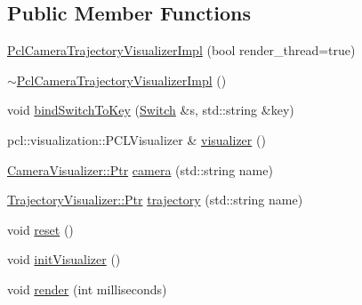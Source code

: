 \subsection*{Public Member Functions}
\begin{DoxyCompactItemize}
\item 
\mbox{\hyperlink{structdvo_1_1visualization_1_1internal_1_1_pcl_camera_trajectory_visualizer_impl_ac27a7fde4cc28672ebb5e65f80eb8865}{Pcl\+Camera\+Trajectory\+Visualizer\+Impl}} (bool render\+\_\+thread=true)
\item 
\mbox{\hyperlink{structdvo_1_1visualization_1_1internal_1_1_pcl_camera_trajectory_visualizer_impl_a3a8627e770ee2c18d07e79f921e60d16}{$\sim$\+Pcl\+Camera\+Trajectory\+Visualizer\+Impl}} ()
\item 
void \mbox{\hyperlink{structdvo_1_1visualization_1_1internal_1_1_pcl_camera_trajectory_visualizer_impl_a21c3f13d2d5ccb2f2913a08a421cd7fd}{bind\+Switch\+To\+Key}} (\mbox{\hyperlink{structdvo_1_1visualization_1_1_switch}{Switch}} \&s, std\+::string \&key)
\item 
pcl\+::visualization\+::\+P\+C\+L\+Visualizer \& \mbox{\hyperlink{structdvo_1_1visualization_1_1internal_1_1_pcl_camera_trajectory_visualizer_impl_a28159937aa1551faf546b827eddb3f44}{visualizer}} ()
\item 
\mbox{\hyperlink{classdvo_1_1visualization_1_1_camera_visualizer_a473ebecc62e1d4edba21027d858789a2}{Camera\+Visualizer\+::\+Ptr}} \mbox{\hyperlink{structdvo_1_1visualization_1_1internal_1_1_pcl_camera_trajectory_visualizer_impl_a1834a57c67d10cbeac37362c546d3575}{camera}} (std\+::string name)
\item 
\mbox{\hyperlink{classdvo_1_1visualization_1_1_trajectory_visualizer_aac33ef5979fe64ee33409f1afa977fd3}{Trajectory\+Visualizer\+::\+Ptr}} \mbox{\hyperlink{structdvo_1_1visualization_1_1internal_1_1_pcl_camera_trajectory_visualizer_impl_a603eeb0964ce83fff1e736003177661c}{trajectory}} (std\+::string name)
\item 
void \mbox{\hyperlink{structdvo_1_1visualization_1_1internal_1_1_pcl_camera_trajectory_visualizer_impl_a3b1dc7581be3c4e278d0a60678be494e}{reset}} ()
\item 
void \mbox{\hyperlink{structdvo_1_1visualization_1_1internal_1_1_pcl_camera_trajectory_visualizer_impl_a79a0458c9c30be3b18f9cbc3a0d4002f}{init\+Visualizer}} ()
\item 
void \mbox{\hyperlink{structdvo_1_1visualization_1_1internal_1_1_pcl_camera_trajectory_visualizer_impl_ae2b0083367d0b2955cf2f7adb18a1acb}{render}} (int milliseconds)
\end{DoxyCompactItemize}
